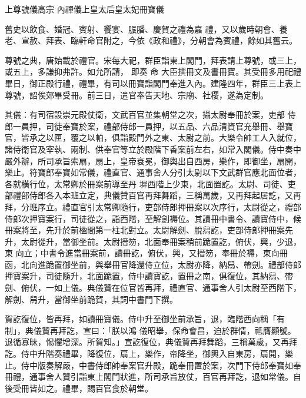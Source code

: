 
\begin{pinyinscope}

 上尊號儀高宗
 內禪儀上皇太后皇太妃冊寶儀



 舊史以飲食、婚冠、賓射、饗宴、脤膰、慶賀之禮為嘉
 禮，又以歲時朝會、養
 老、宣赦、拜表、臨軒命官附之，今依《政和禮》，分朝會為賓禮，餘如其舊云。



 尊號之典，唐始載於禮官。宋每大祀，群臣詣東上閣門，拜表請上尊號，或三上，或五上，多謙抑弗許。如允所請，
 即奏
 命
 大臣撰冊文及書冊寶。其受冊多用祀禮畢日，御正殿行禮，禮畢，有司以冊寶詣閣門奉進入內。建隆四年，群臣三上表上尊號，詔俟郊畢受冊。前三日，遣官奉告天地、宗廟、社稷，遂為定制。



 其儀：有司宿設崇元殿仗衛，文武百官並集朝堂之次，攝太尉奉冊於案，吏部
 侍郎一員押，司徒奉寶於案，禮部侍郎一員押，以五品、六品清資官充舉冊、舉寶官，皆承之以匣，覆之以帕，俱詣殿門外之東、太尉之前。大樂令帥工人入就位，諸侍衛官及宰執、兩制、供奉官等立於殿階下香案前左右，如常入閣儀。侍中奏中嚴外辦，所司承旨索扇，扇上，皇帝袞冕，御輿出自西房，樂作，即御坐，扇開，樂止。符寶郎奉寶如常儀，禮直官、通事舍人分引太尉以下文武群官應北面位者，各就橫行位，太常卿於冊案前導至丹
 墀西階上少東，北面置訖。太尉、司徒、吏部禮部侍郎各入本班立定，典儀贊百官再拜舞蹈，三稱萬歲，又再拜起居訖，又再拜，分班序立。禮直官引太常卿隨行，吏部侍郎押冊案以次序行，太尉從之，禮部侍郎次押寶案行，司徒從之，詣西階，至解劍褥位。其讀冊中書令、讀寶侍中，候冊案將至，先升於前楹間第一柱北對立。太尉解劍、脫舄訖，吏部侍郎押冊案先升，太尉從升，當御坐前。太尉搢笏，北面奉冊案稍前跪置訖，俯伏，興，少退，東
 向立；中書令進當冊案前，讀冊訖，俯伏，興，又搢笏，奉冊於褥，東向冊函，北向進跪置御坐前，與舉冊官降還侍立位，太尉亦降，納舄、帶劍。禮部侍郎押寶案升，司徒隨升，北面跪置，侍中讀寶訖，置冊之南，俱復位，其納舄、帶劍、俯伏，一如上儀。典儀贊在位官皆再拜，禮直官、通事舍人引太尉至西階下，解劍、舄升，當御坐前跪賀，其詞中書門下撰。



 賀訖復位，皆再拜，如讀冊寶儀。侍中升至御坐前承旨，退，臨階西向稱「有制」，典儀贊再拜訖，宣曰：「朕以鴻
 儀昭舉，保命會昌，迫於群情，祗膺顯號。退循寡昧，惕懼增深。所賀知。」宣訖復位，典儀贊再拜舞蹈，三稱萬歲，又再拜訖。侍中升階奏禮畢，降復位，扇上，樂作，帝降坐，御輿入自東房，扇開，樂止。侍中版奏解嚴，中書侍郎帥奉案官升殿，跪奉冊置於案，次門下侍郎奉寶如奉冊禮，通事舍人贊引詣東上閣門狀進，所司承旨放仗，百官再拜訖，退如常儀。自後受冊皆如之。禮畢，賜百官食於朝堂。




\end{pinyinscope}
